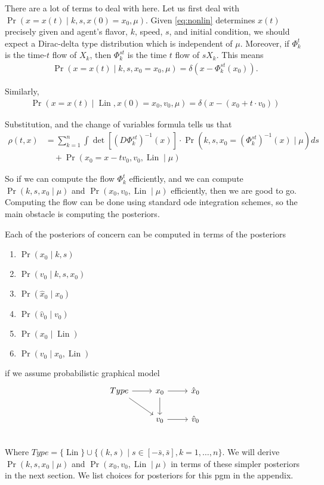 \documentclass[12pt]{amsart}
\DeclareMathOperator{\Lin}{Lin}
\begin{document}
There are a lot of terms to deal with here.
Let us first deal with $\Pr( x = x(t) \mid k,s, x(0) = x_0, \mu )$.
Given \eqref{eq:nonlin} determines $x(t)$ precisely given and agent's flavor, $k$, speed, $s$, and initial condition,
we should expect a Dirac-delta type distribution which is independent of $\mu$.
Moreover, if $\Phi_k^t$ is the time-$t$ flow of $X_k$, then $\Phi_k^{st}$ is the time $t$ flow of $s X_k$. 
This means
\begin{align*}
	\Pr( x  = x(t) \mid k,s, x_0 = x_0 , \mu ) = \delta( x - \Phi_k^{st}( x_0) ).
\end{align*}

Similarly,
\begin{align*}
	\Pr( x = x(t) \mid \Lin, x(0) = x_0, v_0 , \mu ) = \delta \left( x - (x_0 + t \cdot v_0 ) \right)
\end{align*}

Substitution, and the change of variables formula tells us that
\begin{align*}
	\rho(t,x) &= \sum_{k=1}^n \int \det \left[ (D\Phi_{k}^{st})^{-1}(x)  \right] \cdot \Pr( k, s, x_0 = (\Phi_{k}^{st})^{-1} (x) \mid \mu) ds \\
		&\quad + \Pr( x_0 = x- t v_0 ,v_0, \Lin \mid \mu)
\end{align*}

So if we can compute the flow $\Phi_k^{t}$ efficiently, and we can compute $\Pr( k,s,x_0 \mid \mu)$ and $\Pr( x_0, v_0, \Lin \mid \mu)$ efficiently, then we are good to go.
Computing the flow can be done using standard ode integration schemes, so the main obstacle is computing the posteriors.

Each of the posteriors of concern can be computed in terms of the posteriors
\begin{enumerate}
	\item $\Pr( x_0 \mid k,s)$
	\item $\Pr( v_0 \mid k,s,x_0)$
	\item $\Pr( \hat{x}_0 \mid x_0)$
	\item $\Pr( \hat{v}_0 \mid v_0)$
	\item $\Pr( x_0 \mid \Lin)$
	\item $\Pr( v_0 \mid x_0, \Lin )$
\end{enumerate}
if we assume probabilistic graphical model
\begin{equation}
\begin{tikzcd}
	Type \arrow[r] \arrow[rd] & x_0 \arrow[d] \arrow[r] & \hat{x}_0 \\
	 & v_0 \ar[r] & \hat{v}_0 \\
\end{tikzcd}
\label{eq:pgm}
\end{equation}
Where $Type = \{ \Lin \} \cup \{ (k,s) \mid s \in [-\bar{s}, \bar{s}] , k = 1,\dots,n\}$.
We will derive $\Pr( k,s,x_0 \mid \mu)$ and $\Pr( x_0, v_0, \Lin \mid \mu)$ in terms of these simpler posteriors in the next section.
We list choices for posteriors for this pgm in the appendix.
\end{document}
